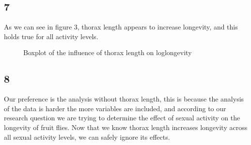 \documentclass{article}
\begin{document}
    \subsection*{7}
    As we can see in figure 3, thorax length appears to increase longevity, and this holds true for all activity levels.
      \begin{figure}[H]
          \centering
          \caption{Boxplot of the influence of thorax length on loglongevity}
          \label{fig:BActivityT}
      \end{figure}

    \subsection*{8}
      Our preference is the analysis without thorax length, this is because the analysis of the data is harder the more variables are included, and according to our research question we are trying to determine the effect of sexual activity on the longevity of fruit flies. Now that we know thorax length increases longevity across all sexual activity levels, we can safely ignore its effects.
\end{document}
